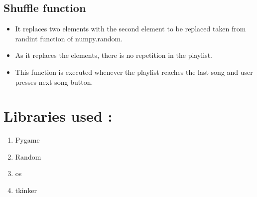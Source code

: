 \documentclass{article}
\begin{document}
\subsection*{Shuffle function}
\begin{itemize}
    \item It replaces two elements with the second element to be replaced taken from randint function of numpy.random.
    \item As it replaces the elements, there is no repetition in the playlist.
    \item This function is executed whenever the playlist reaches the last song and user presses next song button.
\end{itemize}

\section*{Libraries used :}
\begin{enumerate}
    \item Pygame
    \item Random
    \item os
    \item tkinker
\end{enumerate}
\end{document}
